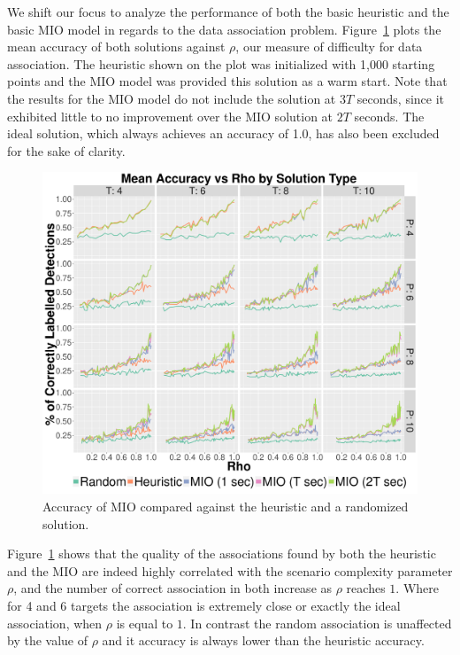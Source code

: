We shift our focus to analyze the performance of both the basic heuristic and the basic MIO model in regards to the data association problem. Figure~\ref{fig:Basic_Accuracy_Summary} plots the mean accuracy of both solutions against $\rho$, our measure of difficulty for data association. The heuristic shown on the plot was initialized with 1,000 starting points and the MIO model was provided this solution as a warm start. Note that the results for the MIO model do not include the solution at $3T$ seconds, since it exhibited little to no improvement over the MIO solution at $2T$ seconds. The ideal solution, which always achieves an accuracy of 1.0, has also been excluded for the sake of clarity.
\begin{figure}[ht]
  \centering  
  \includegraphics[width=\columnwidth]{../Figures/Basic_Accuracy_Summary}
  \caption{Accuracy of MIO compared against the heuristic and a randomized solution.}
  \label{fig:Basic_Accuracy_Summary}
\end{figure}

Figure~\ref{fig:Basic_Accuracy_Summary} shows that the quality of the associations found by both the heuristic and the MIO are indeed highly correlated with the scenario complexity parameter $\rho$, and the number of correct association in both increase as $\rho$ reaches $1$. Where for 4 and 6 targets the association is extremely close or exactly the ideal association, when $\rho$ is equal to $1$. In contrast the random association is unaffected by the value of $\rho$ and it accuracy is always lower than the heuristic accuracy. 

